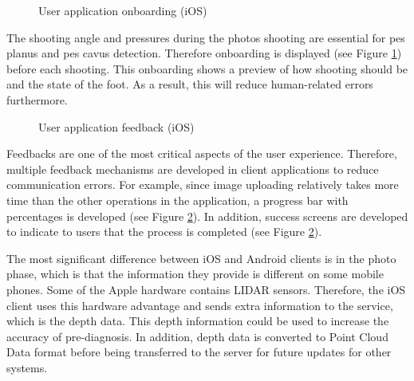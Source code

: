 \begin{figure}[htbp]
\centering
{}
\caption{User application onboarding (iOS)}
\label{fig:UserApplicationOnboarding}
\end{figure}

The shooting angle and pressures during the photos shooting are essential for pes planus and pes cavus detection. Therefore onboarding is displayed (see Figure \ref{fig:UserApplicationOnboarding}) before each shooting. This onboarding shows a preview of how shooting should be and the state of the foot. As a result, this will reduce human-related errors furthermore. 

\begin{figure}[htbp]
\centering
{}
\caption{User application feedback (iOS)}
\label{fig:UserApplicationFeedback}
\end{figure}

Feedbacks are one of the most critical aspects of the user experience.  Therefore, multiple feedback mechanisms are developed in client applications to reduce communication errors. For example, since image uploading relatively takes more time than the other operations in the application, a progress bar with percentages is developed (see Figure \ref{fig:UserApplicationFeedback}). In addition, success screens are developed to indicate to users that the process is completed (see Figure \ref{fig:UserApplicationFeedback}).  

The most significant difference between iOS and Android clients is in the photo phase, which is that the information they provide is different on some mobile phones. Some of the Apple hardware contains LIDAR sensors. Therefore, the iOS client uses this hardware advantage and sends extra information to the service, which is the depth data. This depth information could be used to increase the accuracy of pre-diagnosis. In addition, depth data is converted to Point Cloud Data format before being transferred to the server for future updates for other systems.

